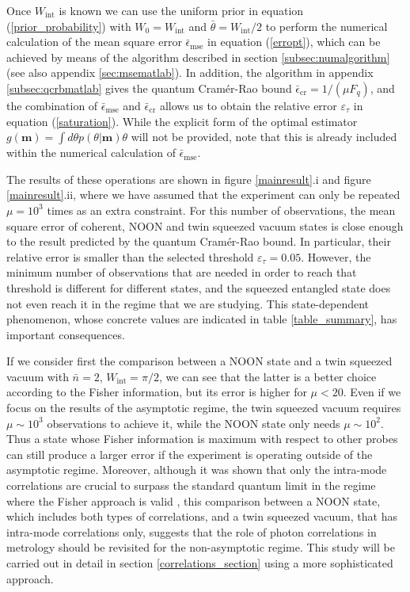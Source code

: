 Once $W_{\mathrm{int}}$ is known we can use the uniform prior in equation (\ref{prior_probability}) with $W_0 = W_{\mathrm{int}}$ and $\bar{\theta} = W_{\mathrm{int}}/2$ to perform the numerical calculation of the mean square error $\bar{\epsilon}_{\mathrm{mse}}$ in equation (\ref{erropt}), which can be achieved by means of the algorithm described in section \ref{subsec:numalgorithm} (see also appendix \ref{sec:msematlab}). In addition, the algorithm in appendix \ref{subsec:qcrbmatlab} gives the quantum Cram\'{e}r-Rao bound $\bar{\epsilon}_{\mathrm{cr}} = 1/(\mu F_q)$, and the combination of $\bar{\epsilon}_{\mathrm{mse}}$ and $\bar{\epsilon}_{\mathrm{cr}}$ allows us to obtain the relative error $\varepsilon_{\tau}$ in equation (\ref{saturation}). While the explicit form of the optimal estimator $g(\boldsymbol{m}) = \int d\theta p(\theta|\boldsymbol{m})\theta$ will not be provided, note that this is already included within the numerical calculation of $\bar{\epsilon}_{\mathrm{mse}}$.

The results of these operations are shown in figure \ref{mainresult}.i and figure \ref{mainresult}.ii, where we have assumed that the experiment can only be repeated $\mu = 10^3$ times as an extra constraint. For this number of observations, the mean square error of coherent, NOON and twin squeezed vacuum states is close enough to the result predicted by the quantum Cram\'{e}r-Rao bound. In particular, their relative error is smaller than the selected threshold $\varepsilon_\tau = 0.05$. However, the minimum number of observations that are needed in order to reach that threshold is different for different states, and the squeezed entangled state does not even reach it in the regime that we are studying. This state-dependent phenomenon, whose concrete values are indicated in table \ref{table_summary}, has important consequences. 

If we consider first the comparison between a NOON state and a twin squeezed vacuum with $\bar{n} = 2$, $W_{\mathrm{int}} = \pi/2$, we can see that the latter is a better choice according to the Fisher information, but its error is higher for $\mu < 20$. Even if we focus on the results of the asymptotic regime, the twin squeezed vacuum requires $\mu \sim 10^3$ observations to achieve it, while the NOON state only needs $\mu \sim 10^2$. Thus a state whose Fisher information is maximum with respect to other probes can still produce a larger error if the experiment is operating outside of the asymptotic regime. Moreover, although it was shown that only the intra-mode correlations are crucial to surpass the standard quantum limit in the regime where the Fisher approach is valid \cite{sahota2015, sahota2016, proctor2017networked}, this comparison between a NOON state, which includes both types of correlations, and a twin squeezed vacuum, that has intra-mode correlations only, suggests that the role of photon correlations in metrology should be revisited for the non-asymptotic regime. This study will be carried out in detail in section \ref{correlations_section} using a more sophisticated approach.

